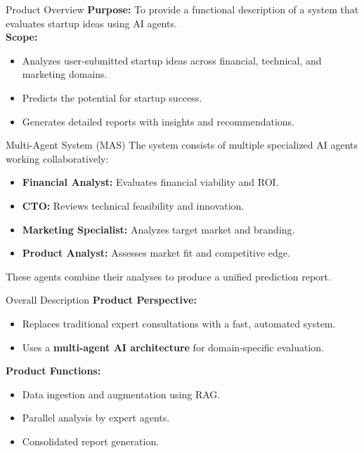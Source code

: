 \documentclass{beamer}
\begin{document}
\begin{frame}{Product Overview}
    \textbf{Purpose:} To provide a functional description of a system that evaluates startup ideas using AI agents.\\[6pt]
    \textbf{Scope:}
    \begin{itemize}
        \item Analyzes user-submitted startup ideas across financial, technical, and marketing domains.
        \item Predicts the potential for startup success.
        \item Generates detailed reports with insights and recommendations.
    \end{itemize}
\end{frame}

\begin{frame}{Multi-Agent System (MAS)}
    The system consists of multiple specialized AI agents working collaboratively:
    \begin{itemize}
        \item \textbf{Financial Analyst:} Evaluates financial viability and ROI.
        \item \textbf{CTO:} Reviews technical feasibility and innovation.
        \item \textbf{Marketing Specialist:} Analyzes target market and branding.
        \item \textbf{Product Analyst:} Assesses market fit and competitive edge.
    \end{itemize}
    These agents combine their analyses to produce a unified prediction report.
\end{frame}

\begin{frame}{Overall Description}
    \textbf{Product Perspective:}
    \begin{itemize}
        \item Replaces traditional expert consultations with a fast, automated system.
        \item Uses a \textbf{multi-agent AI architecture} for domain-specific evaluation.
    \end{itemize}
    \vspace{6pt}
    \textbf{Product Functions:}
    \begin{itemize}
        \item Data ingestion and augmentation using RAG.
        \item Parallel analysis by expert agents.
        \item Consolidated report generation.
    \end{itemize}
\end{frame}
\end{document}

